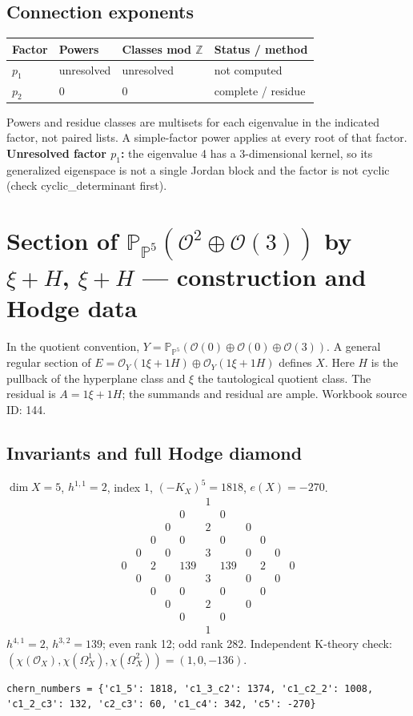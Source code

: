 \documentclass[10pt,a4paper]{article}
\begin{document}
\subsection*{Connection exponents}
\begin{center}\begin{tabular}{llll}\toprule Factor & Powers & Classes mod $\mathbb Z$ & Status / method\\\midrule
$p_{1}$ & unresolved & unresolved & not computed\\
$p_{2}$ & $0$ & $0$ & complete / residue\\
\bottomrule\end{tabular}\end{center}
Powers and residue classes are multisets for each eigenvalue in the indicated factor, not paired lists. A simple-factor power applies at every root of that factor.
\textbf{Unresolved factor $p_{1}$:} the eigenvalue 4 has a 3-dimensional kernel, so its generalized eigenspace is not a single Jordan block and the factor is not cyclic (check cyclic\_determinant first).
\clearpage\section*{Section of $\mathbb P_{\mathbb P^{5}}(\mathcal O^{2}\oplus \mathcal O(3))$ by $\xi +H$, $\xi +H$ --- construction and Hodge data}\label{entry:PB5-144}
In the quotient convention, $Y=\mathbb P_{\mathbb P^{5}}(\mathcal O(0)\oplus\mathcal O(0)\oplus\mathcal O(3))$.
A general regular section of $E=\mathcal O_Y(1\xi+1H)\oplus\mathcal O_Y(1\xi+1H)$ defines $X$.
Here $H$ is the pullback of the hyperplane class and $\xi$ the tautological quotient class. The residual is $A=1\xi+1H$; the summands and residual are ample.
Workbook source ID: 144.
\subsection*{Invariants and full Hodge diamond}
$\dim X=5$, $h^{1,1}=2$, index $1$, $(-K_X)^5=1818$, $e(X)=-270$.
\[\begin{array}{ccccccccccc}&&&&&1&&&&&\\&&&&0&&0&&&&\\&&&0&&2&&0&&&\\&&0&&0&&0&&0&&\\&0&&0&&3&&0&&0&\\0&&2&&139&&139&&2&&0\\&0&&0&&3&&0&&0&\\&&0&&0&&0&&0&&\\&&&0&&2&&0&&&\\&&&&0&&0&&&&\\&&&&&1&&&&&\end{array}\]
$h^{4,1}=2$, $h^{3,2}=139$; even rank 12; odd rank 282.
Independent K-theory check: $(\chi(\mathcal O_X),\chi(\Omega_X^1),\chi(\Omega_X^2))=(1, 0, -136)$.
\begin{lstlisting}
chern_numbers = {'c1_5': 1818, 'c1_3_c2': 1374, 'c1_c2_2': 1008, 'c1_2_c3': 132, 'c2_c3': 60, 'c1_c4': 342, 'c5': -270}
\end{lstlisting}
\end{document}

